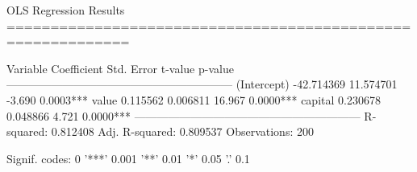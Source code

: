 
OLS Regression Results
============================================================

Variable         Coefficient   Std. Error    t-value    p-value
------------------------------------------------------------
(Intercept)       -42.714369    11.574701     -3.690     0.0003***
value               0.115562     0.006811     16.967     0.0000***
capital             0.230678     0.048866      4.721     0.0000***
------------------------------------------------------------
R-squared: 0.812408
Adj. R-squared: 0.809537
Observations: 200

Signif. codes: 0 '***' 0.001 '**' 0.01 '*' 0.05 '.' 0.1

